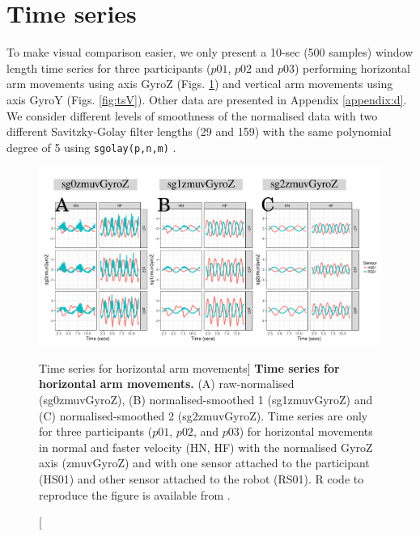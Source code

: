 \section{Time series}
To make visual comparison easier, we only present a 10-sec (500 samples) 
window length time series for three participants ($p01$, $p02$ and $p03$) 
performing horizontal 
arm movements using axis GyroZ (Figs. \ref{fig:tsH})
and  vertical arm movements using axis GyroY (Figs. \ref{fig:tsV}). 
Other data are presented in Appendix \ref{appendix:d}.
We consider different levels of smoothness of the normalised data 
with two different Savitzky-Golay filter lengths (29 and 159) 
with the same polynomial degree of 5 using \texttt{sgolay(p,n,m)} 
\citep{Rsignal}. 
\begin{figure}[!h]
  \centering
\includegraphics[width=1.0\textwidth]{fig_6_01}
    	\caption
	[Time series for horizontal arm movements]{
	{\bf Time series for horizontal arm movements.}
		(A) raw-normalised (sg0zmuvGyroZ), 
		(B) normalised-smoothed 1 (sg1zmuvGyroZ) and
		(C) normalised-smoothed 2 (sg2zmuvGyroZ).
		Time series are only for three participants 
		($p01$, $p02$, and $p03$) 
		for horizontal movements in normal and faster velocity (HN, HF) 
		with the normalised GyroZ axis (zmuvGyroZ) 
		and with one sensor attached to the participant (HS01) 
		and other sensor attached to the robot (RS01).	
	R code to reproduce the figure is available from \cite{hwum2018}.
        }
    \label{fig:tsH}
\end{figure}
